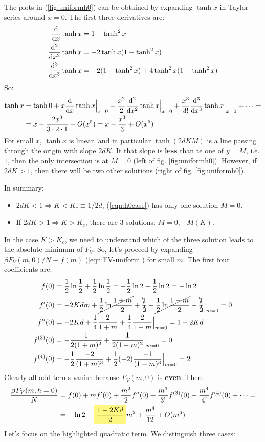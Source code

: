\documentclass[../../main.tex]{subfiles}
\begin{document}
The plots in (\ref{fig:uniformh0}) can be obtained by expanding $\tanh x$ in Taylor series around $x = 0$. The first three derivatives are:
\begin{align*}
    \dv{x} \tanh x &= 1- \tanh^2 x\\
    \dv[2]{x} \tanh x &= -2 \tanh x(1-\tanh^2 x)\\
    \dv[3]{x} \tanh x &= -2(1-\tanh^2 x ) + 4\tanh^2 x (1-\tanh^2 x)
\end{align*}
So:
\begin{align}\nonumber
    \tanh x &= \tanh 0 +x \dv{x}\tanh x\Big|_{x=0} + \frac{x^2}{2} \dv[2]{x} \tanh x\Big|_{x=0} + \frac{x^3}{3!}\dv[3]{x} \tanh x\Big|_{x=0} + \dots = \\
    &= x -\frac{2x^3}{3\cdot 2 \cdot 1} + O(x^5) = x -\frac{x^3}{3} + O(x^5) 
    \label{eqn:tanh-exp}
\end{align}
For small $x$, $\tanh x$ is linear, and in particular $\tanh(2d K M)$ is a line passing through the origin with slope $2dK$. It that slope is \textbf{less}  than te one of $y=M$, i.e. $1$, then the only intersection is at $M=0$ (left of fig. \ref{fig:uniformh0}). However, if $2dK > 1$, then there will be two other solutions (right of fig. \ref{fig:uniformh0}). 

In summary:
\begin{itemize}
    \item $2dK < 1 \Rightarrow K < K_c \equiv 1/2d$, (\ref{eqn:h0case}) has only one solution $M=0$.
    \item If $2dK > 1 \Rightarrow K > K_c$, there are $3$ solutions: $M=0, \pm M(K)$.
\end{itemize}

In the case $K > K_c$, we need to understand which of the three solution leads to the absolute minimum of $F_V$. So, let's proceed by expanding $\beta F_V(m,0)/N \equiv f(m)$ (\ref{eqn:FV-uniform}) for small $m$. The first four coefficients are:
\begin{align*}
    f(0) &= \frac{1}{2} \ln \frac{1}{2} + \frac{1}{2} \ln \frac{1}{2} = -\frac{1}{2} \ln 2 - \frac{1}{2}\ln 2 = -\ln 2\\
    f'(0) &= -2 K d m + \cancel{\frac{1}{2}\ln \frac{1+m}{2}} + \bcancel{\frac{1}{2}} -\cancel{\frac{1}{2}\ln \frac{1-m}{2}} -\bcancel{\frac{1}{2}} \Big|_{m=0} = 0\\
    f''(0) &= -2Kd +\frac{1}{4}\frac{2}{1+m} +\frac{1}{4}\frac{2}{1-m}\Big|_{m=0} = 1-2Kd    \\
    f^{(3)}(0) &= -\frac{1}{2(1+m)^2} + \frac{1}{2(1-m)^2} \Big|_{m=0} = 0  \\
    f^{(4)}(0) &= -\frac{1}{2}\frac{-2}{(1+m)^3} + \frac{1}{2}(-2)\frac{-1}{(1-m)^3} \Big|_{m=0} = 2    
\end{align*}
Clearly all odd terms vanish because $F_V(m,0)$ is \textbf{even}. Then: 
\begin{align*}
    \frac{\beta F_V(m, h=0)}{N} &= f(0) + mf'(0) + \frac{m^2}{2}f''(0) + \frac{m^3}{3!}f^{(3)}(0) + \frac{m^4}{4!}f^{(4)}(0) + \dots =\\
    &= -\ln 2 +\hlc{Yellow}{\frac{1-2Kd}{2}} m^2  + \frac{m^4}{12} + O(m^6) 
\end{align*}
Let's focus on the highlighted quadratic term. We distinguish three cases:
\end{document}
